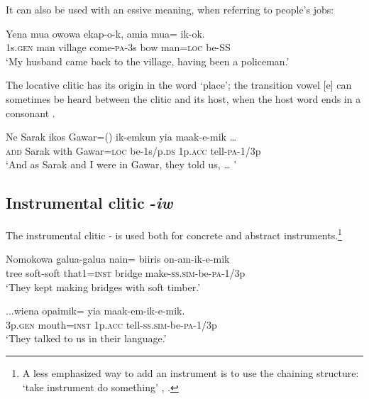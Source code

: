 It can also be used with an essive meaning, when referring to people's jobs:

\ea%
\label{ex:3:x765}
\gll Yena mua owowa ekap-o-k, amia mua= ik-ok. \\
1s.\textsc{gen} man village come-\textsc{pa}-3s bow man=\textsc{loc} be-SS \\
\glt`My husband came back to the village, having been a policeman.'
\z

The locative clitic has its origin in the word  `place'; the transition vowel [e] can sometimes be heard between the clitic and its host, when the host word ends in a consonant .

\ea%
\label{ex:3:x764}
\gll Ne Sarak ikos Gawar=() ik-emkun yia maak-e-mik {\dots} \\
\textsc{add} Sarak with Gawar=\textsc{loc} be-1s/p.\textsc{ds} 1p.\textsc{acc} tell-\textsc{pa}-1/3p\\
\glt`And as Sarak and I were in Gawar, they told us, {\dots} '
\z

\subsection{Instrumental clitic -\textit{iw}}\label{sec:3:y:x}
{}
The instrumental clitic -\textstyleStyleVernacularWordsItalic{} is used both for concrete  and abstract  instruments.\footnote{A less emphasized way to add an instrument is to use the chaining structure: `take instrument do something' , .} 

\ea%
\label{ex:3:x766}
\gll Nomokowa galua-galua nain= biiris on-am-ik-e-mik \\
tree soft-soft that1=\textsc{inst} bridge make-\textsc{ss}.\textsc{sim}-be-\textsc{pa}-1/3p\\
\glt`They kept making bridges with soft timber.'
\z

\ea%
\label{ex:3:x768}
\gll ...wiena opaimik= yia maak-em-ik-e-mik. \\
3p.\textsc{gen} mouth=\textsc{inst} 1p.\textsc{acc} tell-\textsc{ss}.\textsc{sim}-be-\textsc{pa}-1/3p\\
\glt`They talked to us in their language.'
\z

